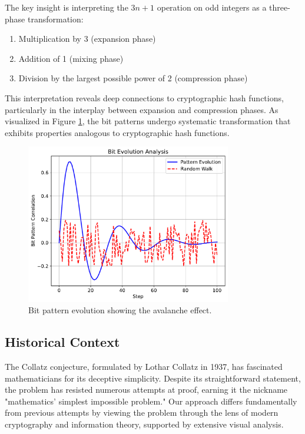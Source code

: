 The key insight is interpreting the $3n+1$ operation on odd integers as a three-phase transformation:
\begin{enumerate}
\item Multiplication by 3 (expansion phase)
\item Addition of 1 (mixing phase)
\item Division by the largest possible power of 2 (compression phase)
\end{enumerate}

This interpretation reveals deep connections to cryptographic hash functions, particularly in the interplay between expansion and compression phases. As visualized in Figure \ref{fig:bit_evolution}, the bit patterns undergo systematic transformation that exhibits properties analogous to cryptographic hash functions.

\begin{figure}[h]
\centering
\includegraphics[width=0.8\textwidth]{figures/bit_evolution.pdf}
\caption{Bit pattern evolution showing the avalanche effect.}
\label{fig:bit_evolution}
\end{figure}

\subsection{Historical Context}
The Collatz conjecture, formulated by Lothar Collatz in 1937, has fascinated mathematicians for its deceptive simplicity. Despite its straightforward statement, the problem has resisted numerous attempts at proof, earning it the nickname "mathematics' simplest impossible problem." Our approach differs fundamentally from previous attempts by viewing the problem through the lens of modern cryptography and information theory, supported by extensive visual analysis.

